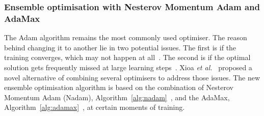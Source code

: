 %
\subsubsection{Ensemble optimisation with Nesterov Momentum Adam and AdaMax}
The Adam algorithm remains the most commonly used optimiser.
The reason behind changing it to another lie in two potential issues.
The first is if the training converges, which may not happen at all~\cite{reddi_convergence_2019}.
The second is if the optimal solution gets frequently missed at large learning steps~\cite{wilson_marginal_2017}.
Xioa \textit{et al.}~\cite{xiao_accurate_2019} proposed a novel alternative of combining several optimisers to address those issues.
The new ensemble optimisation algorithm is based on the combination of Nesterov Momentum Adam (Nadam), \mbox{Algorithm~\ref{alg:nadam}}~\cite{dozat_nadam_2016}, and the AdaMax, \mbox{Algorithm~\ref{alg:adamax}}~\cite{kingma_adam_2017}, at certain moments of training.

